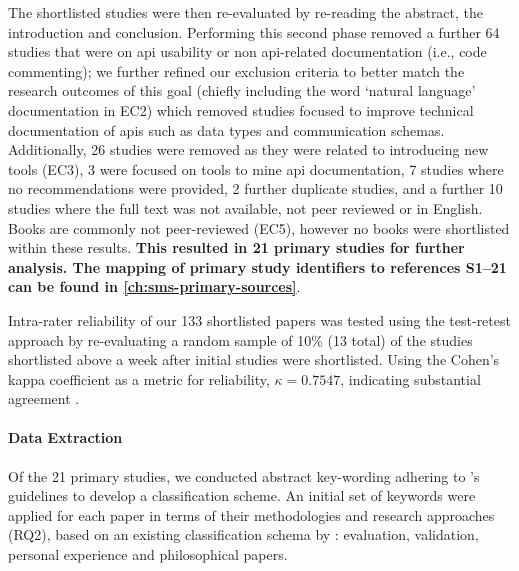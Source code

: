 The shortlisted studies were then re-evaluated by re-reading the abstract, the introduction and conclusion. Performing this second phase removed a further 64 studies that were on \gls{api} usability or non \gls{api}-related  documentation (i.e., code commenting); we further refined our exclusion criteria to better match the research outcomes of this goal (chiefly including the word `natural language' documentation in EC2) which removed studies focused to improve technical documentation of \glspl{api} such as data types and communication schemas. Additionally, 26 studies were removed as they were related to introducing new tools (EC3), 3 were focused on tools to mine \gls{api} documentation, 7 studies where no recommendations were provided, 2 further duplicate studies, and a further 10 studies where the full text was not available, not peer reviewed or in English. Books are commonly not peer-reviewed (EC5), however no books were shortlisted within these results. \textbf{This resulted in 21 primary studies for further analysis. The mapping of primary study identifiers to references S1--21 can be found in \cref{ch:sms-primary-sources}}.

Intra-rater reliability of our 133 shortlisted papers was tested using the test-retest approach \citep{Kitchenham:2007dd} by re-evaluating a random sample of 10\% (13 total) of the studies shortlisted above a week after initial studies were shortlisted. Using the Cohen's kappa coefficient as a metric for reliability, $\kappa=0.7547$, indicating substantial agreement \citep{Landis:1977kv}.

\paragraph{Data Extraction}
\label{esem2019:sec:data-extraction}

Of the 21 primary studies, we conducted abstract key-wording adhering to \citeauthor{Petersen:2008td}'s guidelines \citep{Petersen:2008td} to develop a classification scheme.
An initial set of keywords were applied for each paper in terms of their methodologies and research approaches (RQ2), based on an existing classification schema by \citet{Wieringa:2006vd}: evaluation, validation, personal experience and philosophical papers.

